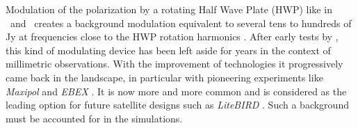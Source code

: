 {Modulation of the polarization by a rotating Half Wave Plate (HWP) like in
\nika\ and \nikad\ creates a background modulation equivalent to several tens to
hundreds of Jy at frequencies close to the HWP rotation harmonics
\citep{2017A&A...599A..34R}. After early tests by , this kind of modulating device has been left aside for
 years in the context of millimetric observations. With the
improvement of technologies it progressively came back in the landscape, in
particular with pioneering experiments like \emph{Maxipol}
\citep{2007ApJ...665...42J} and \emph{EBEX} \citep{2010SPIE.7741E..1CR}. It is
now more and more common and is considered as the leading option for future
satellite designs such as \emph{LiteBIRD} . Such a background must
be accounted for in the simulations.







}







